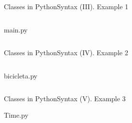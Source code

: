 \documentclass[10pt,compress]{beamer} %
\begin{document}
\begin{frame}{Classes in Python}{Syntax (III). Example 1}
    \begin{columns}
			\begin{block}{main.py}
			\vspace{-0.3cm} 
			\end{block}
	\end{columns}				 	
\end{frame}

\begin{frame}{Classes in Python}{Syntax (IV). Example 2}
\vspace{-0.2cm}
    \begin{columns}
			\begin{block}{bicicleta.py}
			\vspace{-0.3cm} 
			\vspace{-0.3cm} 
			\end{block}
	\end{columns}				 	
\end{frame}

\begin{frame}{Classes in Python}{Syntax (V). Example 3}
	\vspace{-0.2cm}
	\begin{block}{Time.py}
	\vspace{-0.3cm}
		
	\vspace{-0.3cm} 
	\end{block}
\end{frame}
\end{document}

